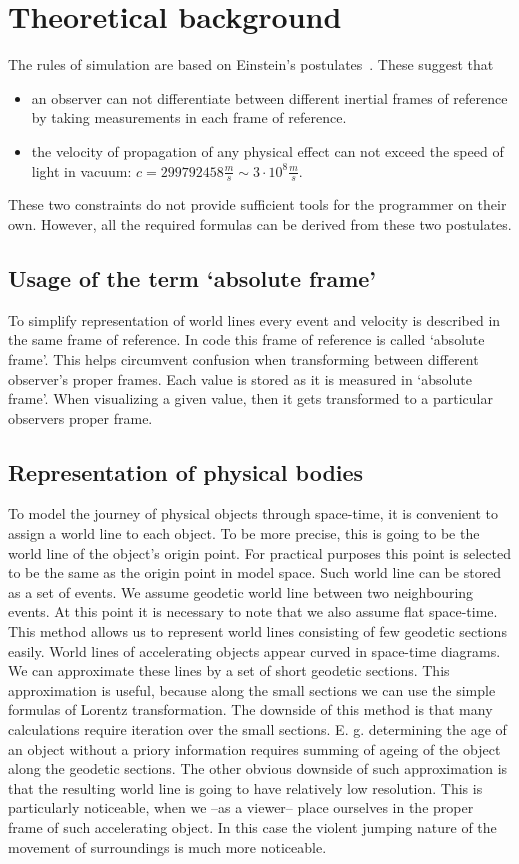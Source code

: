 \documentclass{egpubl}
\begin{document}
\section{Theoretical background}
\label{sec:theoretical_background}
The rules of simulation are based on Einstein's postulates~\cite{EinsteinElectrodynamics}. These suggest that
\begin{itemize}
\item an observer can not differentiate between different inertial frames of reference by taking measurements in each frame of reference.
\item the velocity of propagation of any physical effect can not exceed
the speed of light in vacuum: $c=299792458 \frac{m}{s} \sim 3 \cdot 10^8 \frac{m}{s}$.
 \end{itemize}
These two constraints do not provide sufficient tools for the programmer on their own. However, all the required formulas can be derived from these two postulates.

\subsection{Usage of the term `absolute frame'}
To simplify representation of world lines every event and velocity is described in the same frame of reference. In code this frame of reference is called `absolute frame'. This helps circumvent confusion when transforming between different observer's proper frames. Each value is stored as it is measured in `absolute frame'. When visualizing a given value, then it gets transformed to a particular observers proper frame.

\subsection{Representation of physical bodies}
To model the journey of physical objects through space-time, it is convenient to assign a world line to each object. To be more precise, this is going to be the world line of the object's origin point. For practical purposes this point is selected to be the same as the origin point in model space. Such world line can be stored as a set of events. We assume geodetic world line between two neighbouring events. At this point it is necessary to note that we also assume flat space-time. This method allows us to represent world lines consisting of few geodetic sections easily. World lines of accelerating objects appear curved in space-time diagrams. We can approximate these lines by a set of short geodetic sections. This approximation is useful, because along the small sections we can use the simple formulas of Lorentz transformation. The downside of this method is that many calculations require iteration over the small sections. E. g. determining the age of an object without a priory information requires summing of ageing of the object along the geodetic sections. The other obvious downside of such approximation is that the resulting world line is going to have relatively low resolution. This is particularly noticeable, when we --as a viewer-- place ourselves in the proper frame of such accelerating object. In this case the violent jumping nature of the movement of surroundings is much more noticeable.
\end{document}
